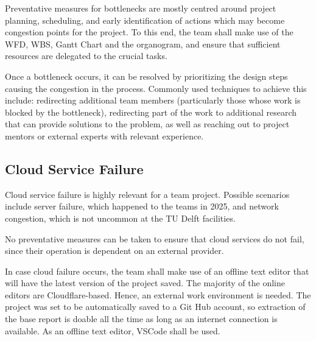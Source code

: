 Preventative measures for bottlenecks are mostly centred around project planning, scheduling, and early identification of actions which may become congestion points for the project. To this end, the team shall make use of the WFD, WBS, Gantt Chart and the organogram, and ensure that sufficient resources are delegated to the crucial tasks.

Once a bottleneck occurs, it can be resolved by prioritizing the design steps causing the congestion in the process. Commonly used techniques to achieve this include: redirecting additional team members (particularly those whose work is blocked by the bottleneck), redirecting part of the work to additional research that can provide solutions to the problem, as well as reaching out to project mentors or external experts with relevant experience.

\subsection{Cloud Service Failure}
Cloud service failure is highly relevant for a team project. Possible scenarios include server failure, which happened to the teams in 2025, and network congestion, which is not uncommon at the TU Delft facilities.

No preventative measures can be taken to ensure that cloud services do not fail, since their operation is dependent on an external provider.


In case cloud failure occurs, the team shall make use of an offline text editor that will have the latest version of the project saved. The majority of the online editors are Cloudflare-based. Hence, an external work environment is needed. The project was set to be automatically saved to a Git Hub account, so extraction of the base report is doable all the time as long as an internet connection is available. As an offline text editor, VSCode shall be used.
